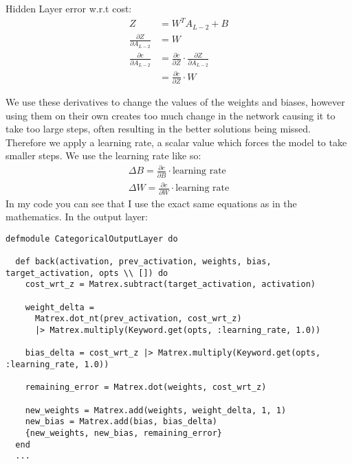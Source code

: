 Hidden Layer error w.r.t cost:
\begin{equation}
    \begin{aligned}
        Z &= W^{T}A_{L-2} + B\\
        \frac{\partial Z}{\partial A_{L-2}} &= W\\[2em]
        \frac{\partial c}{\partial A_{L-2}} &= \frac{\partial c}{\partial Z} \cdot \frac{\partial Z}{\partial A_{L-2}}\\
                                      &= \frac{\partial c}{\partial Z} \cdot W
    \end{aligned}
\end{equation}

We use these derivatives to change the values of the weights and biases, however
using them on their own creates too much change in the network causing it to
take too large steps, often resulting in the better solutions being missed.
Therefore we apply a learning rate, a scalar value which forces the model to take smaller steps.
We use the learning rate like so:
\begin{equation}
    \begin{aligned}
        \Delta B = \frac{\partial c}{\partial B} \cdot \text{learning rate}\\[1em]
        \Delta W = \frac{\partial c}{\partial W} \cdot \text{learning rate} 
    \end{aligned}
\end{equation}
\clearpage
In my code you can see that I use the exact same equations as in the mathematics.
In the output layer:
\begin{lstlisting}
defmodule CategoricalOutputLayer do

  def back(activation, prev_activation, weights, bias, target_activation, opts \\ []) do
    cost_wrt_z = Matrex.subtract(target_activation, activation)

    weight_delta =
      Matrex.dot_nt(prev_activation, cost_wrt_z)
      |> Matrex.multiply(Keyword.get(opts, :learning_rate, 1.0))

    bias_delta = cost_wrt_z |> Matrex.multiply(Keyword.get(opts, :learning_rate, 1.0))

    remaining_error = Matrex.dot(weights, cost_wrt_z)

    new_weights = Matrex.add(weights, weight_delta, 1, 1)
    new_bias = Matrex.add(bias, bias_delta)
    {new_weights, new_bias, remaining_error}
  end
  ...
\end{lstlisting}


